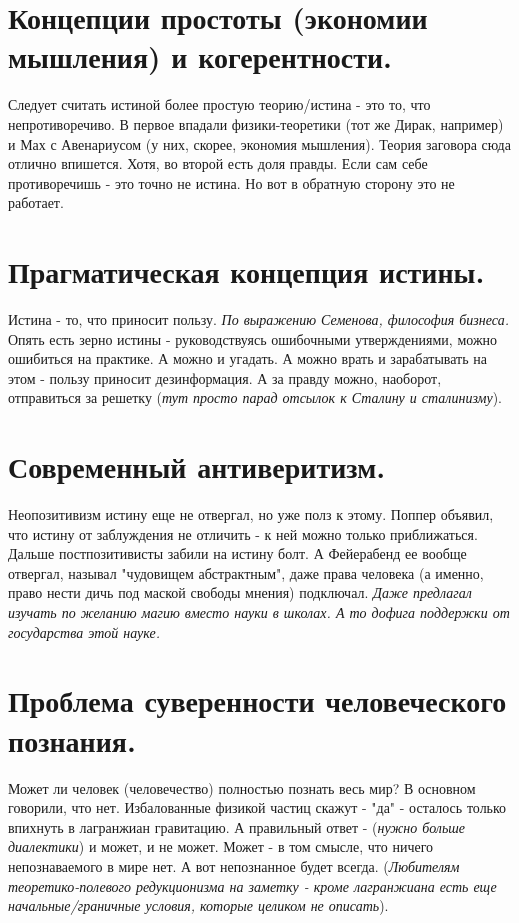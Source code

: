 \section{ Концепции простоты (экономии мышления) и когерентности.}
Следует считать истиной более простую теорию/истина - это то, что непротиворечиво. В первое впадали физики-теоретики (тот же Дирак, например) и Мах с Авенариусом (у них, скорее, экономия мышления). Теория заговора сюда отлично впишется. Хотя, во второй есть доля правды. Если сам себе противоречишь - это точно не истина. Но вот в обратную сторону это не работает.

\section{ Прагматическая концепция истины.}
Истина - то, что приносит пользу. \textit{По выражению Семенова, философия бизнеса.} Опять есть зерно истины - руководствуясь ошибочными утверждениями, можно ошибиться на практике. А можно и угадать. А можно врать и зарабатывать на этом - пользу приносит дезинформация. А за правду можно, наоборот, отправиться за решетку (\textit{тут просто парад отсылок к Сталину и сталинизму}). 

\section{ Современный антиверитизм.}
Неопозитивизм истину еще не отвергал, но уже полз к этому. Поппер объявил, что истину от заблуждения не отличить - к ней можно только приближаться. Дальше постпозитивисты забили на истину болт. А Фейерабенд ее вообще отвергал, называл "чудовищем абстрактным", даже права человека (а именно, право нести дичь под маской свободы мнения) подключал. \textit{Даже предлагал изучать по желанию магию вместо науки в школах. А то дофига поддержки от государства этой науке.}

\section{ Проблема суверенности человеческого познания.}
Может ли человек (человечество) полностью познать весь мир? В основном говорили, что нет. Избалованные физикой частиц скажут - "да" - осталось только впихнуть в лагранжиан гравитацию. А правильный ответ - (\textit{нужно больше диалектики}) и может, и не может. Может - в том смысле, что ничего непознаваемого в мире нет. А вот непознанное будет всегда. (\textit{Любителям теоретико-полевого редукционизма на заметку - кроме лагранжиана есть еще начальные/граничные условия, которые целиком не описать}).

